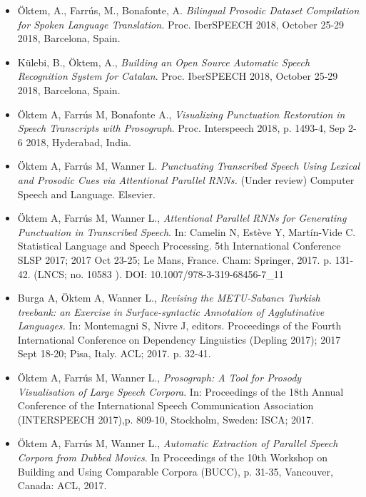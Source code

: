 \begin{itemize}
\item Öktem, A., Farrús, M., Bonafonte, A. \textit{Bilingual Prosodic Dataset Compilation for Spoken Language Translation.} Proc. IberSPEECH 2018, October 25-29 2018, Barcelona, Spain.

\item Külebi, B., Öktem, A., \textit{Building an Open Source Automatic Speech Recognition System for Catalan}. Proc. IberSPEECH 2018, October 25-29 2018, Barcelona, Spain.

\item Öktem A, Farrús M, Bonafonte A., \textit{Visualizing Punctuation Restoration in Speech Transcripts with Prosograph}. Proc. Interspeech 2018, p. 1493-4, Sep 2-6 2018, Hyderabad, India.

\item Öktem A, Farrús M, Wanner L. \textit{Punctuating Transcribed Speech Using Lexical and Prosodic Cues via Attentional Parallel RNNs.} (Under review) Computer Speech and Language. Elsevier.

\item Öktem A, Farrús M, Wanner L., \textit{Attentional Parallel RNNs for Generating Punctuation in Transcribed Speech}. In: Camelin N, Estève Y, Martín-Vide C. Statistical Language and Speech Processing. 5th International Conference SLSP 2017; 2017 Oct 23-25; Le Mans, France. Cham: Springer, 2017. p. 131-42. (LNCS; no. 10583 ). DOI: 10.1007/978-3-319-68456-7\_11

\item Burga A, Öktem A, Wanner L., \textit{Revising the METU-Sabancı Turkish treebank: an Exercise in Surface-syntactic Annotation of Agglutinative Languages.} In: Montemagni S, Nivre J, editors. Proceedings of the Fourth International Conference on Dependency Linguistics (Depling 2017); 2017 Sept 18-20; Pisa, Italy. ACL; 2017. p. 32-41.

\item Öktem A, Farrús M, Wanner L., \textit{Prosograph: A Tool for Prosody Visualisation of Large Speech Corpora}. In: Proceedings of the 18th Annual Conference of the International Speech Communication Association (INTERSPEECH 2017),p. 809-10, Stockholm, Sweden: ISCA; 2017. 

\item Öktem A, Farrús M, Wanner L., \textit{Automatic Extraction of Parallel Speech Corpora from Dubbed Movies}. In Proceedings of the 10th Workshop on Building and Using Comparable Corpora (BUCC), p. 31-35, Vancouver, Canada: ACL, 2017. 

\end{itemize}

